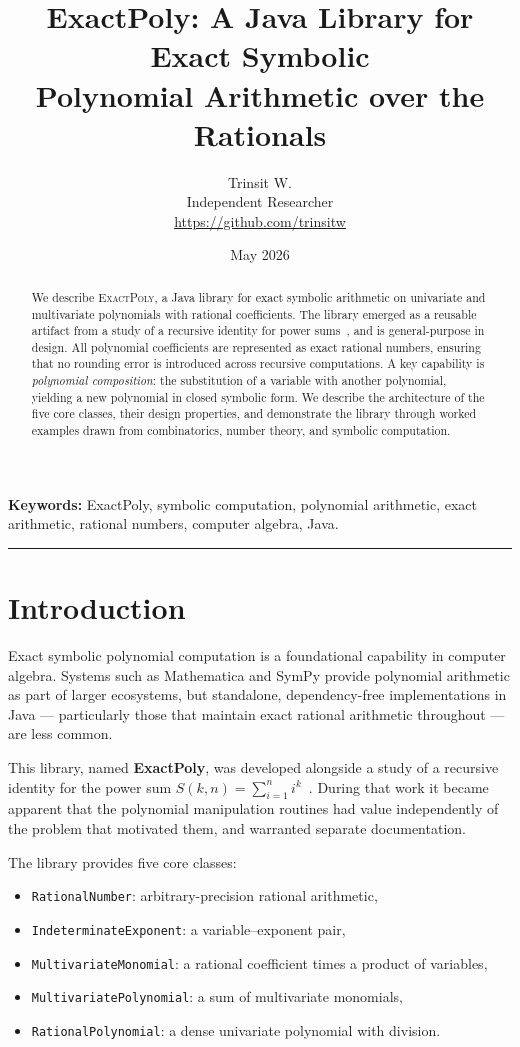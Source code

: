 \documentclass[11pt,a4paper]{article}
\title{\textbf{ExactPoly: A Java Library for Exact Symbolic\\
Polynomial Arithmetic over the Rationals}}
\author{
  Trinsit W.\\
  \small Independent Researcher\\
  \small \href{https://github.com/trinsitw}{https://github.com/trinsitw}
}
\date{May 2026}
\begin{document}
\maketitle

\begin{abstract}
We describe \textsc{ExactPoly}, a Java library for exact symbolic arithmetic
on univariate and multivariate polynomials with rational coefficients.
The library emerged as a reusable artifact from a study of a recursive identity
for power sums~\cite{trinsit2026}, and is general-purpose in design.
All polynomial coefficients are represented as exact rational numbers,
ensuring that no rounding error is introduced across recursive computations.
A key capability is \emph{polynomial composition}: the substitution of a
variable with another polynomial, yielding a new polynomial in closed symbolic
form. We describe the architecture of the five core classes, their design
properties, and demonstrate the library through worked examples drawn from
combinatorics, number theory, and symbolic computation.
\end{abstract}

\smallskip
\noindent\textbf{Keywords:} ExactPoly, symbolic computation, polynomial arithmetic,
exact arithmetic, rational numbers, computer algebra, Java.

\bigskip
\hrule

\section{Introduction}

Exact symbolic polynomial computation is a foundational capability in computer
algebra. Systems such as Mathematica and SymPy provide polynomial arithmetic as
part of larger ecosystems, but standalone, dependency-free implementations in
Java --- particularly those that maintain exact rational arithmetic throughout
--- are less common.

This library, named \textbf{ExactPoly}, was developed alongside a study of a
recursive identity for the power sum
$S(k,n)=\sum_{i=1}^{n}i^{k}$~\cite{trinsit2026}.
During that work it became apparent that the polynomial manipulation routines
had value independently of the problem that motivated them, and warranted
separate documentation.

The library provides five core classes:
\begin{itemize}[noitemsep]
  \item \texttt{RationalNumber}: arbitrary-precision rational arithmetic,
  \item \texttt{IndeterminateExponent}: a variable--exponent pair,
  \item \texttt{MultivariateMonomial}: a rational coefficient times a product of variables,
  \item \texttt{MultivariatePolynomial}: a sum of multivariate monomials,
  \item \texttt{RationalPolynomial}: a dense univariate polynomial with division.
\end{itemize}
\end{document}
